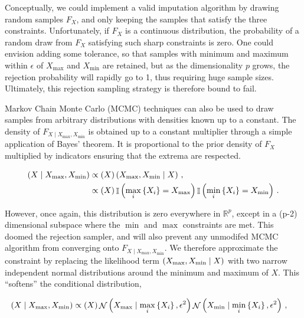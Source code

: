\documentclass[letter]{article}
\newcommand{\genericdel}[3]{%
      \left#1#3\right#2
    }
\newcommand{\del}[1]{\genericdel(){#1}}
\newcommand{\cbr}[1]{\genericdel\{\}{#1}}
\let\Pr\relax
\DeclareMathOperator{\Pr}{\mathbb{P}}
\DeclareMathOperator{\Ind}{\mathbb{I}}
\DeclareMathOperator{\normal}{\mathcal{N}}
\newcommand{\Xmax}{X_{\max}}
\newcommand{\Xmin}{X_{\min}}
\newcommand{\Fcond}{F_{X \mid \Xmax,\Xmin}}
\newcommand{\eqlabel}[1]{\label{#1}}
\begin{document}
        Conceptually, we could implement a valid imputation algorithm by drawing random samples \(F_X\),
and only keeping the samples that satisfy the three constraints.
Unfortunately, if \(F_X\) is a continuous distribution, the probability of a random draw from \(F_X\) satisfying such sharp constraints is zero.
One could envision adding some tolerance, so that samples with minimum and maximum within \(\epsilon\) of \(\Xmax\) and \(\Xmin\) are retained, but as the dimensionality \(p\) grows, the rejection probability will rapidly go to 1, thus requiring huge sample sizes.
Ultimately, this rejection sampling strategy is therefore bound to fail.
    


        Markov Chain Monte Carlo (MCMC) techniques can also be used to draw samples from arbitrary distributions with densities known up to a constant. The density of \(\Fcond\) is obtained up to a constant multiplier through a simple application of Bayes' theorem. It is proportional to the prior density of \(F_X\) multiplied by indicators ensuring that the extrema are respected.

\begin{equation}\begin{split}
    \Pr\del{X \mid \Xmax,\Xmin} &\propto \Pr\del{X} \Pr\del{\Xmax,\Xmin \mid X} \,, \\
           &\propto \Pr\del{X} \Ind\del{ \max_i\cbr{X_i} = \Xmax }\Ind\del{ \min_i\cbr{X_i} = \Xmin } \,.
\end{split}
\eqlabel{eq:bayes_exact}
\end{equation}

However, once again, this distribution is zero everywhere in \(\mathbb{R}^p\), except in a (p-2) dimensional subspace where the \(\min\) and \(\max\) constraints are met.
This doomed the rejection sampler, and will also prevent any unmodifed MCMC algorithm from converging onto \(\Fcond\).
We therefore approximate the constraint by replacing the likelihood term \(\Pr\del{\Xmax,\Xmin \mid X}\) with two narrow independent normal distributions around the minimum and maximum of \(X\).
This ``softens'' the conditional distribution,

\begin{equation}
\begin{split}
    \Pr\del{X \mid \Xmax,\Xmin} &\propto \Pr\del{X} 
                                         \normal\del{\Xmax \mid \max_i\cbr{X_i}, \epsilon^2}
                                         \normal\del{\Xmin \mid \min_i\cbr{X_i}, \epsilon^2}\,,
\end{split}
\eqlabel{eq:normal_lik}
\end{equation}
\end{document}
